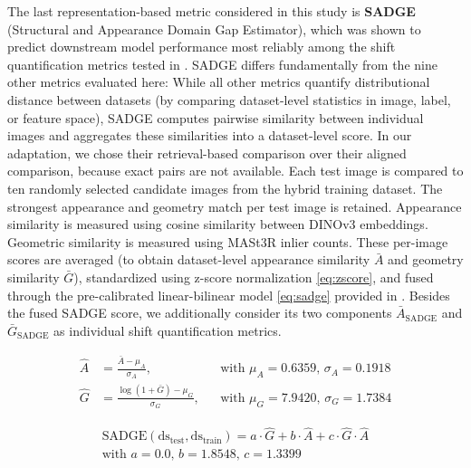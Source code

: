 \documentclass[conference]{IEEEtran}
\begin{document}
\smallskip
The last representation-based metric considered in this study is \textbf{SADGE} (Structural and Appearance Domain Gap Estimator), which was shown to predict downstream model performance most reliably among the shift quantification metrics tested in \cite{bartkowiak2026}. SADGE differs fundamentally from the nine other metrics evaluated here: While all other metrics quantify distributional distance between datasets (by comparing dataset-level statistics in image, label, or feature space), SADGE computes pairwise similarity between individual images and aggregates these similarities into a dataset-level score. In our adaptation, we chose their retrieval-based comparison over their aligned comparison, because exact pairs are not available. Each test image is compared to ten randomly selected candidate images from the hybrid training dataset. The strongest appearance and geometry match per test image is retained. Appearance similarity is measured using cosine similarity between DINOv3 \cite{simeoni2025dinov3} embeddings. Geometric similarity is measured using MASt3R \cite{mast3r} inlier counts. These per-image scores are averaged (to obtain dataset-level appearance similarity $\bar{A}$ and geometry similarity $\bar{G}$), standardized using z-score normalization \eqref{eq:zscore}, and fused through the pre-calibrated linear-bilinear model \eqref{eq:sadge} provided in \cite{bartkowiak2026}. Besides the fused SADGE score, we additionally consider its two components $\bar{A}_{\text{SADGE}}$ and $\bar{G}_{\text{SADGE}}$ as individual shift quantification metrics.

\begin{equation} \label{eq:zscore}
\begin{aligned}
\hat{A} &= \frac{\bar{A} - \mu_A}{\sigma_A}, && \text{with } \mu_A = 0.6359, \, \sigma_A = 0.1918 \\
\hat{G} &= \frac{\log(1+\bar{G}) - \mu_G}{\sigma_G}, && \text{with } \mu_G = 7.9420, \, \sigma_G = 1.7384
\end{aligned}
\end{equation}

\begin{equation}
\label{eq:sadge}
\begin{split}
\text{SADGE}(\text{ds}_\text{test}, \text{ds}_\text{train}) = a \cdot \hat{G} + b \cdot \hat{A} + c \cdot \hat{G} \cdot \hat{A}
\\
\text{with } a=0.0\text{, } b=1.8548\text{, } c=1.3399
\end{split}
\end{equation}
\end{document}

